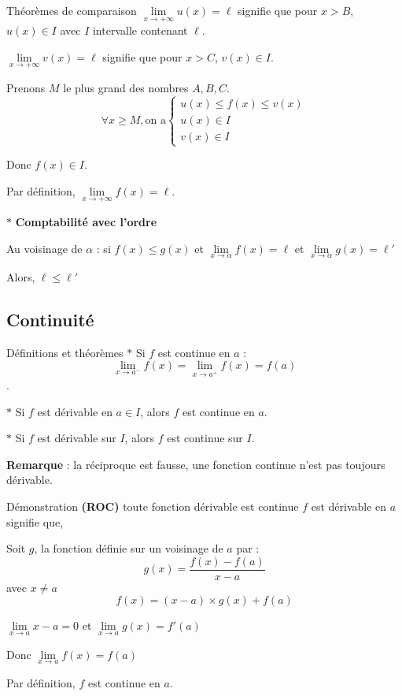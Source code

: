 \begin{bclogo}{Théorèmes de comparaison}
$\lim\limits_{x \to +\infty} u(x)=\ell $ signifie que pour $x>B$, $u(x)\in I$ avec $I$ intervalle contenant $\ell$.

$\lim\limits_{x \to +\infty} v(x)=\ell$ signifie que pour $x>C$, $v(x)\in I$.

Prenons $M$ le plus grand des nombres $A,B,C$. 
\[\forall x\geqslant M, \text{on a} \left\lbrace\begin{array}{l} u(x)\leqslant f(x) \leqslant v(x) \\ u(x)\in I\\ v(x)\in I \end{array}\right. \]

Donc $f(x)\in I$.

Par définition, $\lim\limits_{x \to +\infty} f(x)=\ell$.

\medskip
$\ast$ \textbf{Comptabilité avec l'ordre}

Au voisinage de $\alpha$ : si $f(x)\leqslant g(x)$ et $\lim\limits_{x \to \alpha} f(x)=\ell$ et $\lim\limits_{x \to \alpha} g(x)=\ell '$ 

Alors, $\ell \leqslant \ell '$
\end{bclogo}


\subsection{Continuité}
\begin{bclogo}{Définitions et théorèmes}
$\ast$ Si $f$ est continue en $a$ : \[\lim\limits_{x\to a^-} f(x)=\lim\limits_{x\to a^+} f(x)=f(a)\].

$\ast$ Si $f$ est dérivable en $a\in I$, alors $f$ est continue en $a$.

$\ast$ Si $f$ est dérivable sur $I$, alors $f$ est continue sur $I$.

\textbf{Remarque} : la réciproque est fausse, une fonction continue n'est pas toujours dérivable.
\end{bclogo}

\medskip

\begin{bclogo}{Démonstration \textbf{(ROC)} toute fonction dérivable est continue}
$f$ est dérivable en $a$ signifie que, 

Soit $g$, la fonction définie sur un voisinage de $a$ par : \[g(x)=\frac{f(x)-f(a)}{x-a}\]
avec $x\neq a$
\[f(x)=(x-a)\times g(x) + f(a)\]

\medskip

$\lim\limits_{x\to a} x-a=0$  et $\lim\limits_{x\to a}g(x)=f'(a)$

\medskip
Donc $\lim\limits_{x\to a} f(x)=f(a)$

\medskip
Par définition, $f$ est continue en $a$.
\end{bclogo}

